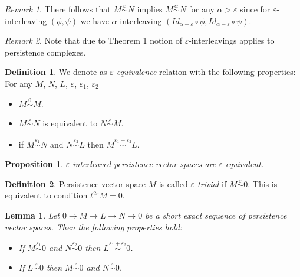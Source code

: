 \documentclass[a4paper, 12pt]{article}
\newtheorem{proposition}{Proposition}
\newtheorem{lemma}{Lemma}
\theoremstyle{definition}
\newtheorem{definition}{Definition}
\theoremstyle{remark}
\newtheorem{remark}{Remark}
\newcommand{\define}[1]{{\textit{#1}}}
\begin{document}
\begin{remark}
There follows that $M \stackrel{\varepsilon}{\sim} N$ implies $M \stackrel{\alpha}{\sim} N$ for any $\alpha > \varepsilon$ since for $\varepsilon$-interleaving $(\phi, \psi)$ we have $\alpha$-interleaving $(Id_{\alpha - \varepsilon} \circ \phi, Id_{\alpha - \varepsilon} \circ \psi)$.
\end{remark}

\begin{remark}
  Note that due to Theorem 1 notion of $\varepsilon$-interleavings applies to persistence complexes.
\end{remark}

\begin{definition}
  We denote as \define{$\varepsilon$-equivalence} relation with the following properties:\\
  For any $M$, $N$, $L$, $\varepsilon$, $\varepsilon_1$, $\varepsilon_2$
  \begin{itemize}
    \item $M \stackrel{0}{\sim} M$.
    \item $M \stackrel{\varepsilon}{\sim} N$ is equivalent to $N \stackrel{\varepsilon}{\sim} M$.
    \item if $M \stackrel{\varepsilon_1}{\sim} N$ and $N \stackrel{\varepsilon_2}{\sim} L$ then $M \stackrel{\varepsilon_1 + \varepsilon_2}{\sim} L$.
  \end{itemize}
\end{definition}

\begin{proposition}
  $\varepsilon$-interleaved persistence vector spaces are $\varepsilon$-equivalent.
\end{proposition}

\begin{definition}
  Persistence vector space $M$ is called \define{$\varepsilon$-trivial} if $M \stackrel{\varepsilon}{\sim} 0$. This is equivalent to condition $t^{2\varepsilon}M = 0$.
\end{definition}

\begin{lemma}
  Let $0 \to M \to L \to N \to 0$ be a short exact sequence of persistence vector spaces. Then the following properties hold:
  \begin{itemize}
    \item If $M \stackrel{\varepsilon_1}{\sim} 0$ and $N \stackrel{\varepsilon_2}{\sim} 0$ then $L \stackrel{\varepsilon_1 + \varepsilon_2}{\sim} 0$.
    \item If $L \stackrel{\varepsilon}{\sim} 0$ then $M \stackrel{\varepsilon}{\sim} 0$ and $N \stackrel{\varepsilon}{\sim} 0$.
  \end{itemize}
\end{lemma}
\end{document}
